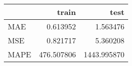 \begin{tabular}{lrr}
\toprule
{} &       train &         test \\
\midrule
MAE  &    0.613952 &     1.563476 \\
MSE  &    0.821717 &     5.360208 \\
MAPE &  476.507806 &  1443.995870 \\
\bottomrule
\end{tabular}
